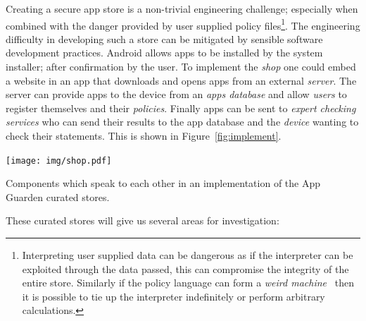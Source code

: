 \documentclass[a4paper]{article}
\begin{document}
Creating a secure app store is a non-trivial engineering challenge; especially
when combined with the danger provided by user supplied policy
files\footnote{Interpreting user supplied data can be dangerous as if the
  interpreter can be exploited through the data passed, this can compromise the
  integrity of the entire store.  Similarly if the policy language can form a
  \emph{weird machine}~\cite{Bratus:2011wr} then it is possible to tie up the
interpreter indefinitely or perform arbitrary calculations.}. The engineering
difficulty in developing such a store can be mitigated by sensible software
development practices.  Android allows apps to be installed by the system
installer; after confirmation by the user.  To implement the \emph{shop} one
could embed a website in an app that downloads and opens apps from an external
\emph{server}.  The server can provide apps to the device from an \emph{apps
database} and allow \emph{users} to register themselves and their
\emph{policies}.  Finally apps can be sent to \emph{expert checking services}
who can send their results to the app database and the \emph{device} wanting to
check their statements.  This is shown in Figure~\ref{fig:implement}.

\begin{marginfigure}
  \texttt{[image: img/shop.pdf]}
  \caption{Components which speak to each other in an implementation of the App
  Guarden curated stores.}
  \label{fig:implement}
\end{marginfigure}

These curated stores will give us several areas for investigation:
\end{document}
